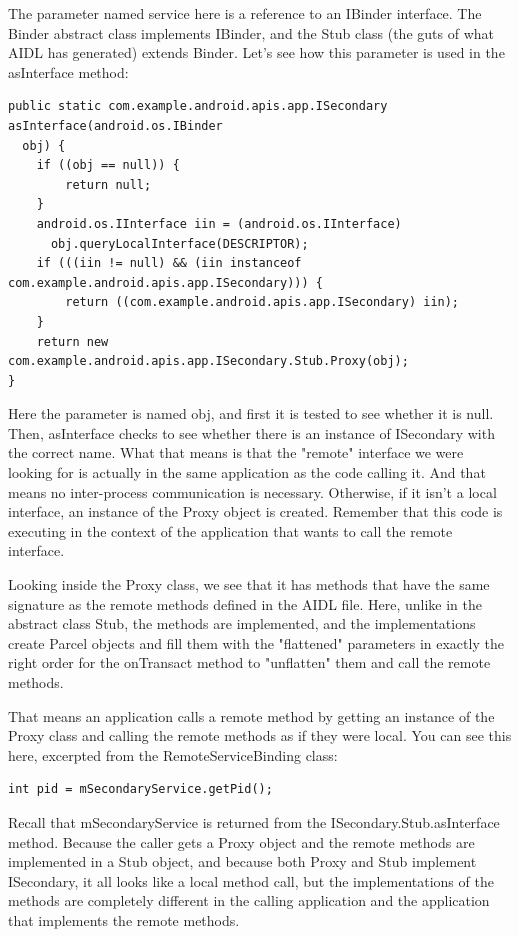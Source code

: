 \documentclass[11pt, a4paper]{book}
\begin{document}
The parameter named service here is a reference to an IBinder interface. The Binder abstract class implements IBinder, and the Stub class (the guts of what AIDL has generated) extends Binder. Let's see how this parameter is used in the asInterface method:
\begin{verbatim}
public static com.example.android.apis.app.ISecondary asInterface(android.os.IBinder 
  obj) {
    if ((obj == null)) {
        return null;
    }
    android.os.IInterface iin = (android.os.IInterface) 
      obj.queryLocalInterface(DESCRIPTOR);
    if (((iin != null) && (iin instanceof com.example.android.apis.app.ISecondary))) {
        return ((com.example.android.apis.app.ISecondary) iin);
    }
    return new com.example.android.apis.app.ISecondary.Stub.Proxy(obj);
}
\end{verbatim}

Here the parameter is named obj, and first it is tested to see whether it is null. Then, asInterface checks to see whether there is an instance of ISecondary with the correct name. What that means is that the "remote" interface we were looking for is actually in the same application as the code calling it. And that means no inter-process communication is necessary. Otherwise, if it isn't a local interface, an instance of the Proxy object is created. Remember that this code is executing in the context of the application that wants to call the remote interface.

Looking inside the Proxy class, we see that it has methods that have the same signature as the remote methods defined in the AIDL file. Here, unlike in the abstract class Stub, the methods are implemented, and the implementations create Parcel objects and fill them with the "flattened" parameters in exactly the right order for the onTransact method to "unflatten" them and call the remote methods.

That means an application calls a remote method by getting an instance of the Proxy class and calling the remote methods as if they were local. You can see this here, excerpted from the RemoteServiceBinding class:
\begin{verbatim}
int pid = mSecondaryService.getPid();
\end{verbatim}

Recall that mSecondaryService is returned from the ISecondary.Stub.asInterface method. Because the caller gets a Proxy object and the remote methods are implemented in a Stub object, and because both Proxy and Stub implement ISecondary, it all looks like a local method call, but the implementations of the methods are completely different in the calling application and the application that implements the remote methods.
\end{document}
